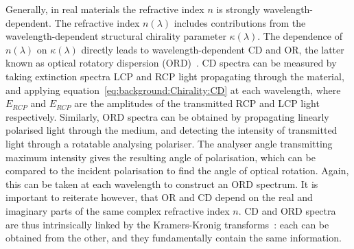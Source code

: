 Generally, in real materials the refractive index $n$ is strongly wavelength-dependent. The refractive index $n(\lambda)$ includes contributions from the wavelength-dependent structural chirality parameter $\kappa(\lambda)$. The dependence of $n(\lambda)$ on $\kappa(\lambda)$ directly leads to wavelength-dependent CD and OR, the latter known as optical rotatory dispersion (ORD)~\cite[\S 9.2]{Parson2007}. CD spectra can be measured by taking extinction spectra LCP and RCP light propagating through the material, and applying equation~\ref{eq:background:Chirality:CD} at each wavelength, where $E_{RCP}$ and $E_{RCP}$ are the amplitudes of the transmitted RCP and LCP light respectively. Similarly, ORD spectra can be obtained by propagating linearly polarised light through the medium, and detecting the intensity of transmitted light through a rotatable analysing polariser. The analyser angle transmitting maximum intensity gives the resulting angle of polarisation, which can be compared to the incident polarisation to find the angle of optical rotation. Again, this can be taken at each wavelength to construct an ORD spectrum. It is important to reiterate however, that OR and CD depend on the real and imaginary parts of the same complex refractive index $n$. CD and ORD spectra are thus intrinsically linked by the Kramers-Kronig transforms~\cite{Schellman1975, Polavarapu2005a}: each can be obtained from the other, and they fundamentally contain the same information. 


